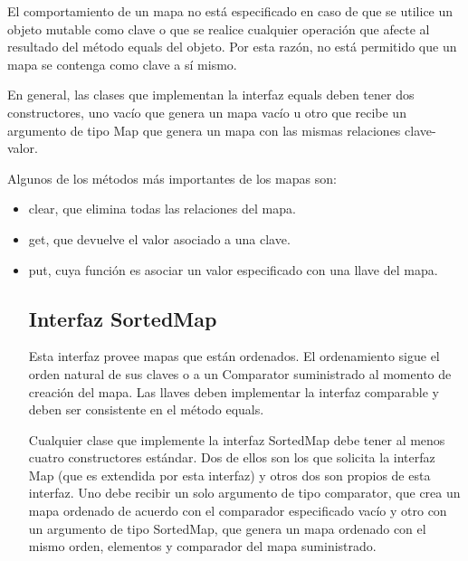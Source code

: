 \documentclass[11pt]{article}
\begin{document}
El comportamiento de un mapa no está especificado en caso de que se 
utilice un objeto mutable como clave o que se realice cualquier 
operación que afecte al resultado del método equals del objeto. Por 
esta razón, no está permitido que un mapa se contenga como clave a sí 
mismo.

\par

En general, las clases que implementan la interfaz equals deben tener 
dos constructores, uno vacío que genera un mapa vacío u otro que 
recibe un argumento de tipo Map que genera un mapa con las mismas 
relaciones clave-valor.

\par

Algunos de los métodos más importantes de los mapas son:

\begin{itemize}

\item clear, que elimina todas las relaciones del mapa.

\item get, que devuelve el valor asociado a una clave.

\item put, cuya función es asociar un valor especificado con una 
llave del mapa.



\subsection{Interfaz SortedMap}

\par

Esta interfaz provee mapas que están ordenados. El ordenamiento sigue 
el orden natural de sus claves o a un Comparator suministrado al 
momento de creación del mapa. Las llaves deben implementar la 
interfaz comparable y deben ser consistente en el método equals.
\par
Cualquier clase que implemente la interfaz SortedMap debe tener al 
menos cuatro constructores estándar. Dos de ellos son los que 
solicita la interfaz Map (que es extendida por esta interfaz) y otros 
dos son propios de esta interfaz. Uno debe recibir un solo argumento 
de tipo comparator, que crea un mapa ordenado de acuerdo con el 
comparador especificado vacío y otro con un argumento de tipo 
SortedMap, que genera un mapa ordenado con el mismo orden, elementos 
y comparador del mapa suministrado.


\end{itemize}
\end{document}

